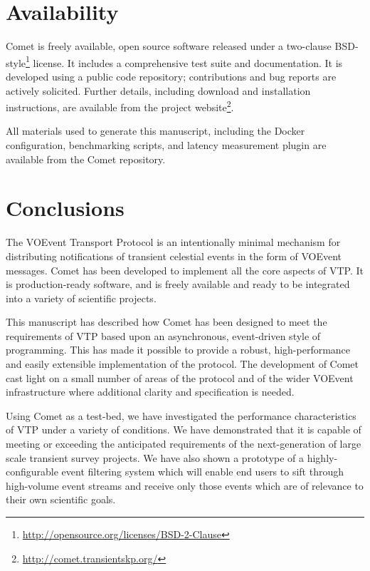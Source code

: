 \documentclass[5p,authoryear]{elsarticle}
\begin{document}
\section{Availability}
\label{sec:avail}

Comet is freely available, open source software released under a two-clause
BSD-style\footnote{\url{http://opensource.org/licenses/BSD-2-Clause}} license.
It includes a comprehensive test suite and documentation. It is developed
using a public code repository; contributions and bug reports are actively
solicited.  Further details, including download and installation instructions,
are available from the project
website\footnote{\url{http://comet.transientskp.org/}}.

All materials used to generate this manuscript, including the Docker
configuration, benchmarking scripts, and latency measurement plugin are
available from the Comet repository.

\section{Conclusions}
\label{sec:conclusions}

The VOEvent Transport Protocol is an intentionally minimal mechanism for
distributing notifications of transient celestial events in the form of
VOEvent messages. Comet has been developed to implement all the core aspects
of VTP\@. It is production-ready software, and is freely available and ready to
be integrated into a variety of scientific projects.

This manuscript has described how Comet has been designed to meet the
requirements of VTP based upon an asynchronous, event-driven style of
programming. This has made it possible to provide a robust, high-performance
and easily extensible implementation of the protocol. The development of Comet
cast light on a small number of areas of the protocol and of the wider VOEvent
infrastructure where additional clarity and specification is needed.

Using Comet as a test-bed, we have investigated the performance characteristics
of VTP under a variety of conditions. We have demonstrated that it is capable
of meeting or exceeding the anticipated requirements of the next-generation of
large scale transient survey projects. We have also shown a prototype of a
highly-configurable event filtering system which will enable end users to
sift through high-volume event streams and receive only those events which are
of relevance to their own scientific goals.
\end{document}
